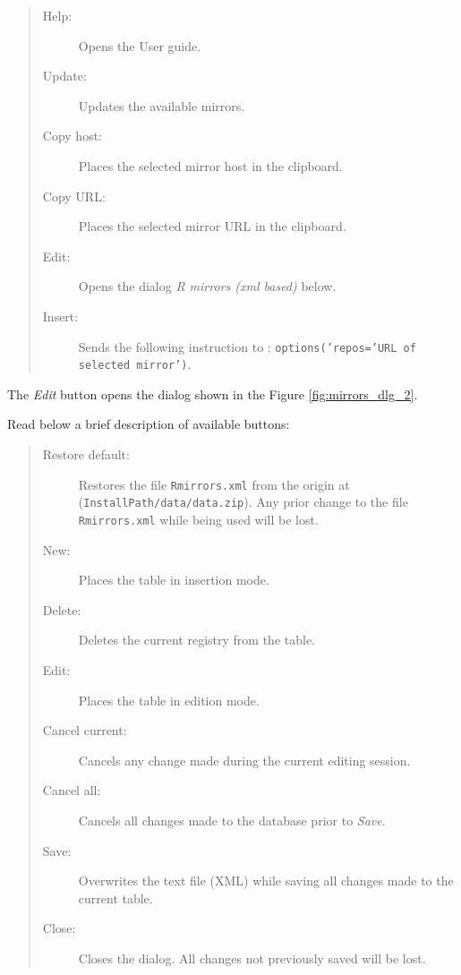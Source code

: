 \begin{quote}
  \begin{footnotesize}
    \begin{description}
      \item[Help:]
        Opens the User guide.
      \item[Update:]
        Updates the available \RR{} mirrors.
      \item[Copy host:]
        Places the selected mirror host in the clipboard.
      \item[Copy URL:]
        Places the selected mirror URL in the clipboard.
      \item[Edit:]
        Opens the dialog \textit{R mirrors (xml based)} below.
      \item[Insert:]
        Sends the following instruction to \RR{}: \texttt{options('repos='URL of selected mirror')}.
    \end{description}
  \end{footnotesize}
\end{quote}

The \textit{Edit} button opens the dialog shown in the Figure \ref{fig:mirrors_dlg_2}.

Read below a brief description of available buttons:

\begin{quote}
  \begin{footnotesize}
    \begin{description}
      \item[Restore default:]
        Restores the file \texttt{Rmirrors.xml} from the origin at
        (\texttt{InstallPath/data/data.zip}). Any prior change to the
        file \texttt{Rmirrors.xml} while being used will be lost.
      \item[New:]
        Places the table in insertion mode.
      \item[Delete:]
        Deletes the current registry from the table.
      \item[Edit:]
        Places the table in edition mode.
      \item[Cancel current:]
        Cancels any change made during the current editing session.
      \item[Cancel all:]
        Cancels all changes made to the database prior to \textit{Save}.
      \item[Save:]
        Overwrites the text file (XML) while saving all changes made to the current table.
      \item[Close:]
        Closes the dialog. All changes not previously saved will be lost.
    \end{description}
  \end{footnotesize}
\end{quote}
